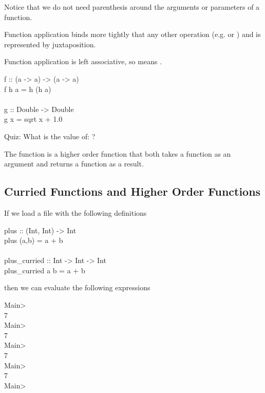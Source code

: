 \documentclass{seminar}
\begin{document}
\begin{slide}
Notice that we do not need parenthesis around the arguments
or parameters of a function.

Function application binds more tightly that any other operation
(e.g. \textcd{+} or ) and is represented by juxtaposition.

\newslide

Function application is left associative, so  means
.

\begin{code}
f :: (a -> a) -> (a -> a)\\
f h a = h (h a)\\
\\
g :: Double -> Double\\
g x = sqrt x + 1.0
\end{code}

Quiz:  \textcolor{QuoteColor}{What is the value of:
?}

The function  is a higher order function that both takes a
function as an argument and returns a function as a result.

\newslide

\subsection*{Curried Functions and Higher Order Functions}

If we load a file with the following definitions
\begin{code}
plus :: (Int, Int) -> Int\\
plus (a,b) = a + b\\
\\
plus\_curried :: Int -> Int -> Int\\
plus\_curried a b = a + b
\end{code}

\newslide

then we can evaluate the following expressions
\begin{code}[SystemColor]
Main> \\
7\\
Main> \\
7\\
Main>\\
7\\
Main> \\
7\\
Main>
\end{code}


\end{slide}
\end{document}
